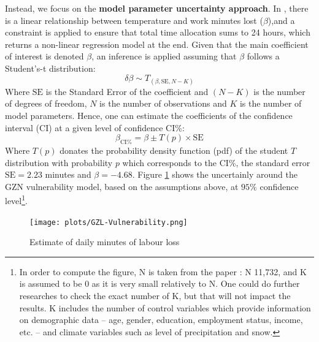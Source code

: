 \documentclass[a4paper,11pt]{extarticle} %
\theoremstyle{definition}
\begin{document}
Instead, we focus on the \textbf{model parameter uncertainty approach}. In \cite{ZhangAndShindell:2021}, there is a linear relationship between temperature and work minutes lost ($\beta$),and a constraint is applied to ensure that total time allocation sums to 24 hours, which returns a non-linear regression model at the end. Given that the main coefficient of interest is denoted $\beta$, an inference is applied assuming that $\beta$ follows a Student's-t distribution:
\begin{equation}
 \label{Eq:uncertaintyStudentT}
 \delta \beta \sim T_{\left(\beta, \mathrm{SE}, N-K\right)}
\end{equation}
Where $\text{SE}$ is the Standard Error of the coefficient and $(N-K)$ is the number of degrees of freedom, $N$ is the number of observations and $K$ is the number of model parameters. Hence, one can estimate the coefficients of the confidence interval (CI) at a given level of confidence CI\%:
\begin{equation}
 \label{Eq:CIStudent}
 \beta_{\mathrm{CI}\%} = \beta \pm T(p) \times \text{SE}
\end{equation}
Where $T(p)$ donates the probability density function (pdf) of the student $T$ distribution with probability $p$ which corresponds to the CI\%, the standard error $\text{SE}=2.23$ minutes and $\beta=-4.68$.
Figure \ref{fig:GZL-Vulnerability} shows the uncertainly around the GZN vulnerability model, based on the assumptions above, at $95\%$ confidence level\footnote{In order to compute the figure, N is taken from the paper \cite{TemperatureAndWork:2021}: N 11,732, and K is assumed to be 0 as it is very small relatively to N. One could do further researches to check the exact number of K, but that will not impact the results. K includes the number of control variables which provide information on demographic data -- age, gender, education, employment status, income, etc. -- and climate variables such as level of precipitation and snow.}.
\begin{figure}[h]
    \centering
    \texttt{[image: plots/GZL-Vulnerability.png]}
    \caption{Estimate of daily minutes of labour loss}
    \label{fig:GZL-Vulnerability}
\end{figure}
\end{document}
